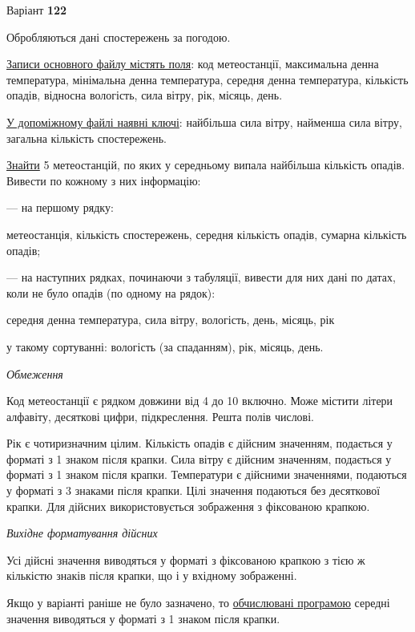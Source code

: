 \documentclass[11pt, ukrainian]{article}
\begin{document}
\par
\newpage
{\center Варіант  \No \textbf { 122 }\par}
\bigskip
Обробляються дані спостережень за погодою. 

\underline{Записи основного файлу містять поля}: код метеостанції, максимальна денна температура, мініма\-ль\-на денна температура, середня денна температура, кількість опадів, відносна вологість, сила вітру, рік, місяць, день.

\underline{У допоміжному файлі наявні ключі}: найбільша сила вітру, найменша сила вітру, загальна кількість спостережень.

\underline{Знайти} 5 метеостанцій, по яких у середньому випала найбільша кількість опадів. Вивести по кожному з них інформацію:\par
{\noindent}--- на першому рядку:\par
метеостанція, кількість спостережень, середня кількість опадів, сумарна кількість опадів;

{\noindent}--- на наступних рядках, починаючи з табуляції, вивести для них дані по датах, коли не було опадів (по одному на рядок):\par
середня денна температура, сила вітру, вологість, день, місяць, рік

{\noindent}у такому сортуванні: вологість (за спаданням), рік, місяць, день.


\bigskip\textit{Обмеження}

Код метеостанції є рядком довжини від 4 до 10 включно.
Може містити літери алфавіту, десяткові цифри, підкреслення. Решта полів числові.

Рік є чотиризначним цілим.
Кількість опадів є дійсним значенням, подається у форматі з 1 знаком після крапки.
Сила вітру є дійсним значенням, подається у форматі з 1 знаком після крапки.
Температури є дійсними значеннями, подаються у форматі з 3 знаками після крапки.
Цілі значення подаються без десяткової крапки.
Для дійсних використовується зображення з фіксованою крапкою.

\textit{Вихідне форматування дійсних}

Усі дійсні значення виводяться у форматі з фіксованою крапкою з тією ж кількістю знаків після крапки, що і у вхідному зображенні.

Якщо у варіанті раніше не було зазначено, то \underline{обчислювані програмою} середні значення виводяться у форматі з 1 знаком після крапки.
\end{document}
